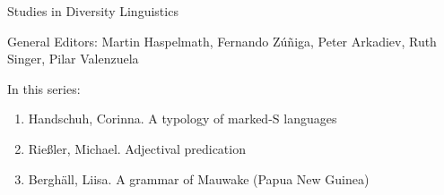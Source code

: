 
{\large Studies in Diversity Linguistics}

\bigskip

General Editors: Martin Haspelmath, Fernando Zúñiga, Peter Arkadiev, Ruth Singer, Pilar Valen­zuela

\bigskip

In this series:

\begin{enumerate}
\item Handschuh, Corinna. A typology of marked-S languages
\item Rießler, Michael. Adjectival predication
\item Berghäll, Liisa. A grammar of Mauwake (Papua New Guinea)
\end{enumerate}



